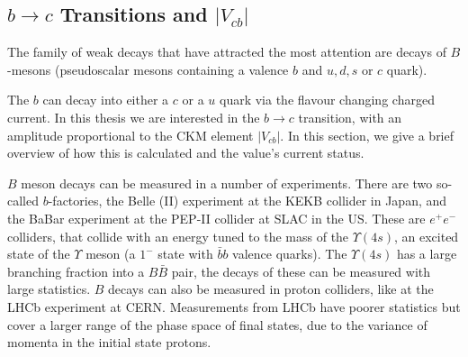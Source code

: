 \subsection{$b\to c$ Transitions and $|V_{cb}|$}

The family of weak decays that have attracted the most attention are decays of $B$-mesons (pseudoscalar mesons containing a valence $b$ and $u,d,s$ or $c$ quark). %

The $b$ can decay into either a $c$ or a $u$ quark via the flavour changing charged current. In this thesis we are interested in the $b\to c$ transition, with an amplitude proportional to the CKM element $|V_{cb}|$. In this section, we give a brief overview of how this is calculated and the value's current status.

$B$ meson decays can be measured in a number of experiments. There are two so-called $b$-factories, the Belle (II) experiment at the KEKB collider in Japan, and the BaBar experiment at the PEP-II collider at SLAC in the US. These are $e^+e^-$ colliders, that collide with an energy tuned to the mass of the $\Upsilon(4s)$, an excited state of the $\Upsilon$ meson (a $1^-$ state with $\bar{b}b$ valence quarks). The $\Upsilon(4s)$ has a large branching fraction into a $B\bar{B}$ pair, the decays of these can be measured with large statistics. $B$ decays can also be measured in proton colliders, like at the LHCb experiment at CERN. Measurements from LHCb have poorer statistics but cover a larger range of the phase space of final states, due to the variance of momenta in the initial state protons.

